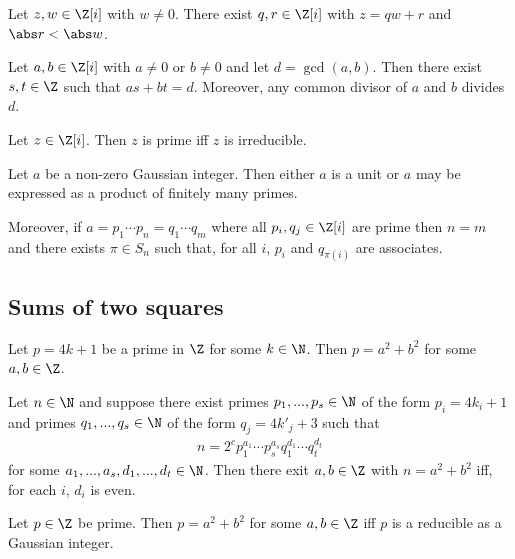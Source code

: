 \documentclass{article}
\begin{document}
\begin{theorem}
	Let $z,w\in\Z[i]$ with $w\not=0$. There exist $q,r\in\Z[i]$ with $z=qw+r$ and $\abs r<\abs w$.
\end{theorem}

\begin{theorem}
	Let $a,b\in\Z[i]$ with $a\not=0$ or $b\not=0$ and let $d=\gcd(a,b)$. Then there exist $s,t\in\Z$
	such that $as+bt=d$. Moreover, any common divisor of $a$ and $b$ divides $d$.
\end{theorem}

\begin{theorem}[Lectures 15-16]
	Let $z\in\Z[i]$. Then $z$ is prime iff $z$ is irreducible.
\end{theorem}

\begin{theorem}
	Let $a$ be a non-zero Gaussian integer. Then either $a$ is a unit or $a$ may be expressed
	as a product of finitely many primes.

	Moreover, if $a=p_1\cdots p_n=q_1\cdots q_m$ where all $p_i,q_j\in\Z[i]$ are prime then
	$n=m$ and there exists $\pi\in S_n$ such that, for all $i$, $p_i$ and $q_{\pi(i)}$ are associates.
\end{theorem}

\subsection{Sums of two squares}

\begin{theorem}[Lectures 15-16]
	Let $p=4k+1$ be a prime in $\Z$ for some $k\in\N$. Then $p=a^2+b^2$ for some
	$a,b\in\Z$.
\end{theorem}

\begin{theorem}[Lectures 15-16]
	Let $n\in\N$ and suppose there exist primes $p_1,...,p_s\in\N$ of the form
	$p_i=4k_i+1$ and primes $q_1,...,q_s\in\N$ of the form $q_j=4k'_j+3$ such that
	\begin{align*}
		n=2^c p_1^{a_1}\cdots p_s^{a_s} q_1^{d_1}\cdots q_t^{d_t}
	\end{align*}
	for some $a_1,...,a_s,d_1,...,d_t\in\N$. Then there exit $a,b\in\Z$ with
	$n=a^2+b^2$ iff, for each $i$, $d_i$ is even.
\end{theorem}

\begin{lemma}[Lectures 15-16]
	Let $p\in\Z$ be prime. Then $p=a^2+b^2$ for some $a,b\in\Z$ iff $p$ is a reducible
	as a Gaussian integer.
\end{lemma}
\end{document}
